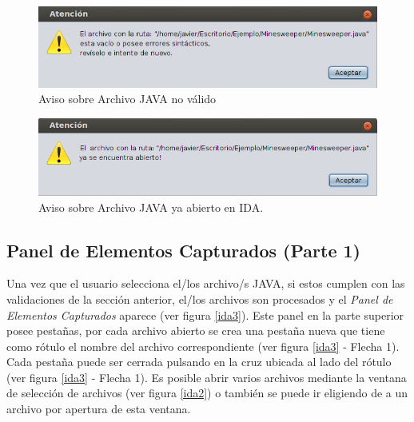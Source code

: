 \documentclass[a4paper,12pt]{report}
\begin{document}
\begin{figure}[t] %
\centerline{%
\includegraphics[scale= 0.8]{./ida_war_01.png}
}
\caption{Aviso sobre Archivo JAVA no válido}
\label{idaWar1}
\end{figure}

\begin{figure}[t] %
\centerline{%
\includegraphics[scale= 0.8]{./ida_war_02.png}
}
\caption{Aviso sobre Archivo JAVA ya abierto en IDA.}
\label{idaWar2}
\end{figure}

\subsection{Panel de Elementos Capturados (Parte 1)}

Una vez que el usuario selecciona el/los archivo/s JAVA, si estos cumplen con las validaciones de la sección anterior, el/los archivos son procesados y el \textit{Panel de Elementos Capturados} aparece (ver figura \ref{ida3}). Este panel en la parte superior posee pestañas, por cada archivo abierto se crea una pestaña nueva que tiene como rótulo el nombre del archivo correspondiente (ver figura \ref{ida3} - Flecha 1). Cada pestaña puede ser cerrada pulsando en la cruz ubicada al lado del rótulo (ver figura \ref{ida3} - Flecha 1). Es posible abrir varios archivos mediante la ventana de selección de archivos (ver figura \ref{ida2}) o también se puede ir eligiendo de a un archivo por apertura de esta ventana. 
\end{document}
